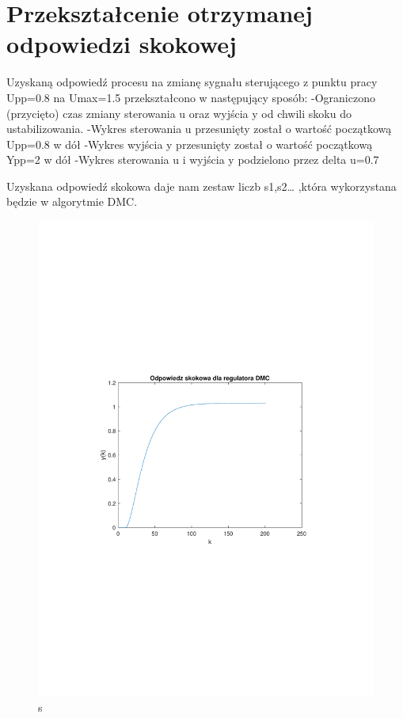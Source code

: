 \section{Przekształcenie otrzymanej odpowiedzi skokowej}

Uzyskaną odpowiedź procesu na zmianę sygnału sterującego z punktu pracy Upp=0.8 na Umax=1.5 przekształcono w następujący sposób:
-Ograniczono (przycięto) czas zmiany sterowania u oraz wyjścia y od chwili skoku do ustabilizowania.
-Wykres sterowania u przesunięty został o wartość początkową Upp=0.8 w dół
-Wykres wyjścia y przesunięty został o wartość początkową Ypp=2 w dół
-Wykres sterowania u i wyjścia y podzielono przez delta u=0.7

Uzyskana odpowiedź skokowa daje nam zestaw liczb s1,s2… ,która wykorzystana będzie w algorytmie DMC.

\begin{figure}[H]
    \centering
    \includegraphics[scale=0.8]{../projekt/zad3/s.pdf}
    \caption{ s }
\end{figure}
